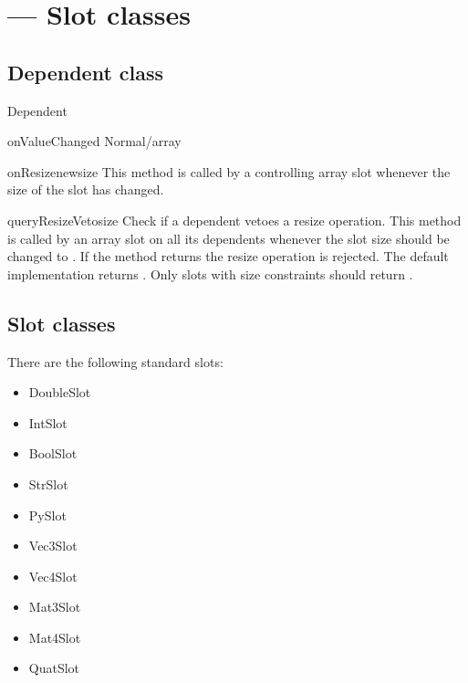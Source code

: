 \section{ ---
         Slot classes}


\subsection{Dependent class}

\begin{classdesc}{Dependent}{}
\end{classdesc}

\begin{methoddesc}{onValueChanged}{}
Normal/array
\end{methoddesc}

\begin{methoddesc}{onResize}{newsize}
This method is called by a controlling array slot whenever the size of
the slot has changed.
\end{methoddesc}

\begin{methoddesc}{queryResizeVeto}{size}
Check if a dependent vetoes a resize operation. This method is called
by an array slot on all its dependents whenever the slot size should
be changed to . If the
method returns  the resize operation is rejected. The
default implementation returns . Only slots with size
constraints should return .
\end{methoddesc}


\subsection{Slot classes}

There are the following standard slots:

\begin{itemize}
\item DoubleSlot
\item IntSlot
\item BoolSlot
\item StrSlot
\item PySlot
\item Vec3Slot
\item Vec4Slot
\item Mat3Slot
\item Mat4Slot
\item QuatSlot
\end{itemize}


